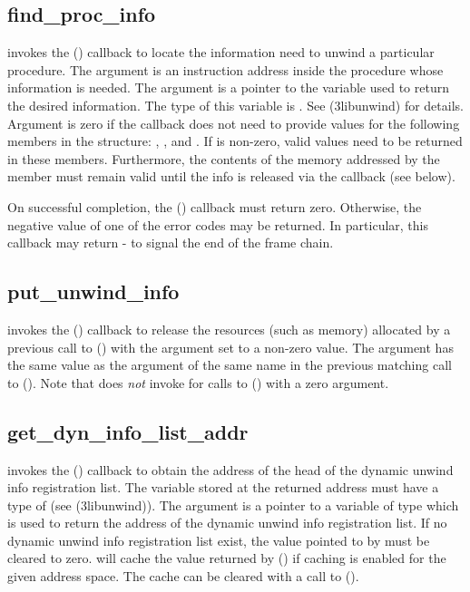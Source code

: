 \documentclass{article}
\begin{document}
\subsection{find\_proc\_info}

 invokes the () callback to
locate the information need to unwind a particular procedure.  The
 argument is an instruction address inside the procedure whose
information is needed.  The  argument is a pointer to the
variable used to return the desired information.  The type of this
variable is .  See
(3libunwind) for details.  Argument
 is zero if the callback does not need to
provide values for the following members in the
 structure: ,
, and .  If
 is non-zero, valid values need to be returned
in these members.  Furthermore, the contents of the memory addressed
by the  member must remain valid until the info is
released via the  callback (see below).

On successful completion, the () callback must
return zero.  Otherwise, the negative value of one of the
 error codes may be returned.  In particular, this
callback may return - to signal the end of
the frame chain.

\subsection{put\_unwind\_info}

 invokes the () callback to
release the resources (such as memory) allocated by a previous call to
() with the  argument
set to a non-zero value.  The  argument has the same value as
the argument of the same name in the previous matching call to
().  Note that  does \emph{not}
invoke  for calls to ()
with a zero  argument.


\subsection{get\_dyn\_info\_list\_addr}

 invokes the ()
callback to obtain the address of the head of the dynamic unwind info
registration list.  The variable stored at the returned address must
have a type of  (see
(3libunwind)).  The  argument is a pointer
to a variable of type  which is used to return the
address of the dynamic unwind info registration list.  If no dynamic
unwind info registration list exist, the value pointed to by
 must be cleared to zero.   will cache the
value returned by () if caching is
enabled for the given address space.  The cache can be cleared with a
call to ().
\end{document}
